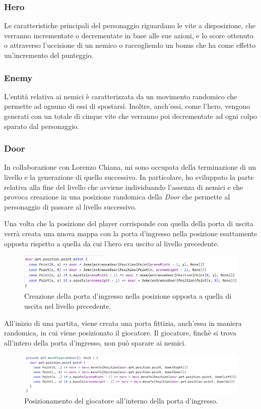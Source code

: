 \subsubsection{Hero}

Le caratteristiche principali del personaggio riguardano le vite a disposizione, che verranno incrementate o decrementate in base alle sue azioni, e lo score ottenuto o attraverso l'uccisione di un nemico o raccogliendo un bonus che ha come effetto un'incremento del punteggio.

\subsubsection{Enemy}

L'entità relativa ai nemici è caratterizzata da un movimento randomico che permette ad ognuno di essi di spostarsi. Inoltre, anch'essi, come l'hero, vengono generati con un totale di cinque vite che verranno poi decrementate ad ogni colpo sparato dal personaggio.

\subsubsection{Door}
In collaborazione con Lorenzo Chiana, mi sono occupata della terminazione di un livello e la generazione di quello successivo. In particolare, ho sviluppato la parte relativa alla fine del livello che avviene individuando l'assenza di nemici e che provoca creazione in una posizione randomica della \textit{Door} che permette al personaggio di passare al livello successivo. 

Una volta che la posizione del player corrisponde con quella della porta di uscita verrà creata una nuova mappa con la porta d'ingresso nella posizione esattamente opposta rispetto a quella da cui l'hero era uscito al livello precedente.

\begin{figure}[H]\centering
  \includegraphics[width=15cm]{res/createOppositeDoor.png}
  \caption{Creazione della porta d'ingresso nella posizione opposta a quella di uscita nel livello precedente.}
  \label{gameState}
\end{figure}

All'inizio di una partita, viene creata una porta fittizia, anch'essa in maniera randomica, in cui viene posizionato il giocatore.
Il giocatore, finchè si trova all'intero della porta d'ingresso, non può sparare ai nemici.

\begin{figure}[H]\centering
  \includegraphics[width=15cm]{res/movePlayerOnDoor.png}
  \caption{Posizionamento del giocatore all'interno della porta d'ingresso.}
  \label{gameState}
\end{figure}


